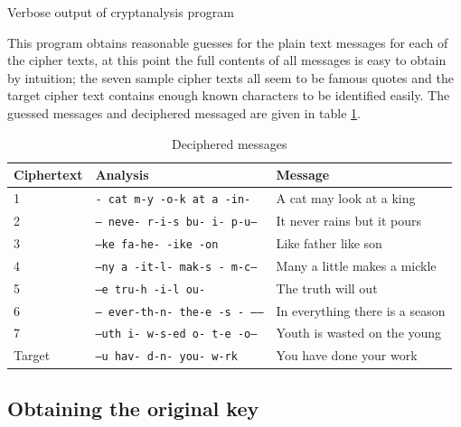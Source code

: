 \documentclass[a4paper]{article}
\begin{document}
\begin{listing}
  \inputminted[frame=lines,fontsize=\scriptsize]{text}{listings/ex3_cryptanalysis_1.txt}
  \caption{Verbose output of cryptanalysis program}
  \label{listing:cryptanalysis_verbose}
\end{listing}

This program obtains reasonable guesses for the plain text messages for each of
the cipher texts, at this point the full contents of all messages is easy to
obtain by intuition; the seven sample cipher texts all seem to be famous quotes
and the target cipher text contains enough known characters to be identified
easily. The guessed messages and deciphered messaged are given in table
\ref{tab:deciphered_messages}.

\begin{table}[h]
  \centering
  \begin{tabular}{lll}
    \hline
    Ciphertext  & Analysis                                  & Message                         \\
    \hline
    1           & \texttt{- cat m-y -o-k at a -in-}         & A cat may look at a king        \\
    2           & \texttt{-- neve- r-i-s bu- i- p-u--}      & It never rains but it pours     \\
    3           & \texttt{--ke fa-he- -ike -on}             & Like father like son            \\
    4           & \texttt{--ny a -it-l- mak-s - m-c---}     & Many a little makes a mickle    \\
    5           & \texttt{--e tru-h -i-l ou-}               & The truth will out              \\
    6           & \texttt{-- ever-th-n- the-e -s - ------}  & In everything there is a season \\
    7           & \texttt{--uth i- w-s-ed o- t-e -o---}     & Youth is wasted on the young    \\
    Target      & \texttt{--u hav- d-n- you- w-rk}          & You have done your work         \\
    \hline
  \end{tabular}
  \caption{Deciphered messages}
  \label{tab:deciphered_messages}
\end{table}

\subsection{Obtaining the original key}
\end{document}
